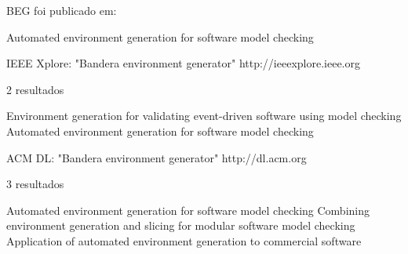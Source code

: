 BEG foi publicado em:

Automated environment generation for software model checking

IEEE Xplore: "Bandera environment generator"
http://ieeexplore.ieee.org

2 resultados

Environment generation for validating event-driven software using model checking
Automated environment generation for software model checking

ACM DL: "Bandera environment generator"
http://dl.acm.org

3 resultados

Automated environment generation for software model checking
Combining environment generation and slicing for modular software model checking
Application of automated environment generation to commercial software
